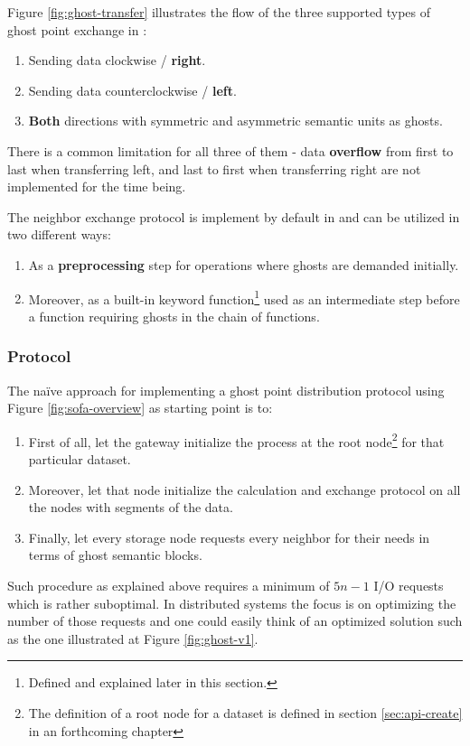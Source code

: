 Figure \ref{fig:ghost-transfer} illustrates the flow of the three supported types of ghost point exchange in \CodeName:

\begin{enumerate}
	\item Sending data clockwise / \textbf{right}.
	\item Sending data counterclockwise / \textbf{left}.
	\item \textbf{Both} directions with symmetric and asymmetric semantic units as ghosts.
\end{enumerate}
\vspace*{2mm}
There is a common limitation for all three of them - data \textbf{overflow} from first to last when transferring left, and last to first when transferring right are not implemented for the time being.
\newline

The neighbor exchange protocol is implement by default in \CodeName and can be utilized in two different ways:

\begin{enumerate}
	\item As a \textbf{preprocessing} step for operations where ghosts are demanded initially.
	\item Moreover, as a built-in keyword function\footnote{Defined and explained later in this section.} used as an intermediate step before a function requiring ghosts in the chain of functions.
\end{enumerate}

\subsubsection*{Protocol}
The naïve approach for implementing a ghost point distribution protocol using Figure \ref{fig:sofa-overview} as starting point is to:
\begin{enumerate}
	\item First of all, let the gateway initialize the process at the root node\footnote{The definition of a root node for a dataset is defined in section \ref{sec:api-create} in an forthcoming chapter} for that particular dataset.
	\item Moreover, let that node initialize the calculation and exchange protocol on all the nodes with segments of the data.
	\item Finally, let every storage node requests every neighbor for their needs in terms of ghost semantic blocks.
\end{enumerate}
\vspace*{2mm}
Such procedure as explained above requires a minimum of $5n-1$ I/O requests which is rather suboptimal. In distributed systems the focus is on optimizing the number of those requests and one could easily think of an optimized solution such as the one illustrated at Figure \ref{fig:ghost-v1}. 

